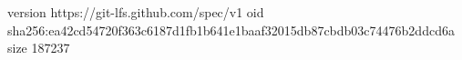 version https://git-lfs.github.com/spec/v1
oid sha256:ea42cd54720f363c6187d1fb1b641e1baaf32015db87cbdb03c74476b2ddcd6a
size 187237

